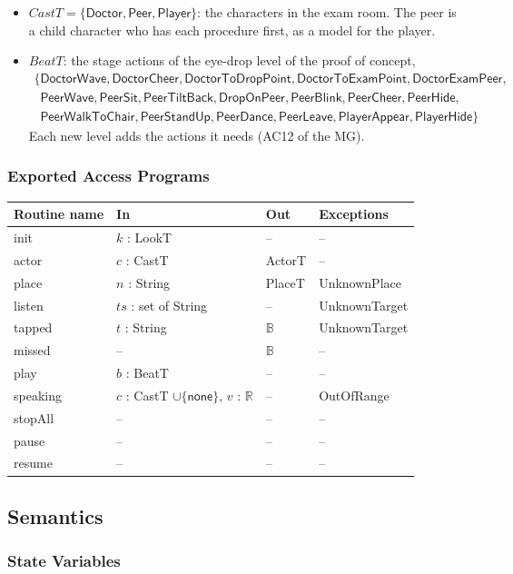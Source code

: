 \documentclass[10pt, titlepage]{article}
\newcommand{\B}{\mathbb{B}}
\newcommand{\R}{\mathbb{R}}
\newcommand{\T}[1]{\mathit{#1}}          %
\newcommand{\V}[1]{\mathsf{#1}}          %
\newenvironment{accessprogs}{%
  \begin{center}\small
  \begin{tabular}{>{\raggedright\arraybackslash}p{3.0cm}
    >{\raggedright\arraybackslash}p{5.0cm}
    >{\raggedright\arraybackslash}p{2.8cm}
    >{\raggedright\arraybackslash}p{3.4cm}}
  \toprule
  \textbf{Routine name} & \textbf{In} & \textbf{Out} & \textbf{Exceptions}\\
  \midrule}{%
  \bottomrule
  \end{tabular}
  \end{center}}
\begin{document}
\begin{itemize}
\item $\T{CastT} = \{\V{Doctor}, \V{Peer}, \V{Player}\}$: the characters in
  the exam room. The peer is a child character who has each procedure first,
  as a model for the player.
\item $\T{BeatT}$: the stage actions of the eye-drop level of the proof of
  concept,
  \[\begin{array}{l}
  \{\V{DoctorWave}, \V{DoctorCheer}, \V{DoctorToDropPoint},
  \V{DoctorToExamPoint}, \V{DoctorExamPeer},\\
  \phantom{\{}\V{PeerWave}, \V{PeerSit}, \V{PeerTiltBack}, \V{DropOnPeer},
  \V{PeerBlink}, \V{PeerCheer}, \V{PeerHide},\\
  \phantom{\{}\V{PeerWalkToChair}, \V{PeerStandUp}, \V{PeerDance},
  \V{PeerLeave}, \V{PlayerAppear}, \V{PlayerHide}\}
  \end{array}\]
  Each new level adds the actions it needs (AC12 of the MG).
\end{itemize}

\subsubsection{Exported Access Programs}

\begin{accessprogs}
init & $k$ : LookT & -- & --\\
actor & $c$ : CastT & ActorT & --\\
place & $n$ : String & PlaceT & UnknownPlace\\
listen & $\T{ts}$ : set of String & -- & UnknownTarget\\
tapped & $t$ : String & $\B$ & UnknownTarget\\
missed & -- & $\B$ & --\\
play & $b$ : BeatT & -- & --\\
speaking & $c$ : CastT $\cup \{\V{none}\}$, $v$ : $\R$ & -- & OutOfRange\\
stopAll & -- & -- & --\\
pause & -- & -- & --\\
resume & -- & -- & --\\
\end{accessprogs}

\subsection{Semantics}

\subsubsection{State Variables}
\end{document}
